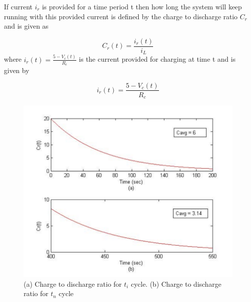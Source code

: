 If current $i_r$ is provided for a time period t then how long the system will keep running with this provided current is defined by the charge to discharge ratio $C_r$ and is given as

\begin{equation}\label{eq:cdr}
 C_r(t) = \frac{i_r(t)}{i_L}
\end{equation}
where $i_r(t) = \frac {5-V_c(t)}{R_c}$ is the current provided for charging at time t and is given by

\begin{equation}\label{eq:ir}
 i_r(t) = \frac {5-V_c(t)}{R_c}
\end{equation}

\begin{figure}[h!]
\centering
\includegraphics[width=1\textwidth]{ctd2.pdf}
\caption{(a) Charge to discharge ratio for $t_i$ cycle. (b) Charge to discharge ratio for $t_n$ cycle}
\label{fig:crs}
\end{figure}

